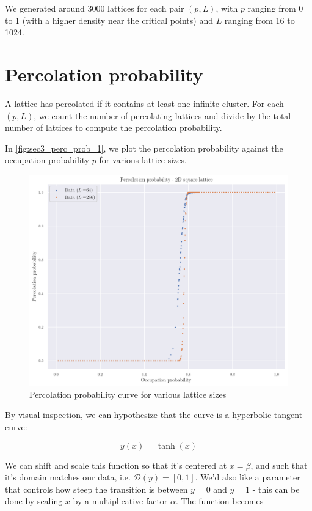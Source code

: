 We generated around 3000 lattices for each pair $(p, L)$, with $p$ ranging from 0 to 1 (with a higher density near the critical points) and $L$ ranging from 16 to 1024.


\section{Percolation probability}

A lattice has percolated if it contains at least one infinite cluster. For each $(p, L)$, we count the number of percolating lattices and divide by the total number of lattices to compute the percolation probability.

In \autoref{fig:sec3_perc_prob_1}, we plot the percolation probability against the occupation probability $p$ for various lattice sizes.


\begin{figure}[H]
  \includegraphics[width=\linewidth]{Images/sec3_perc_prob_1.png}
  \caption{Percolation probability curve for various lattice sizes}
  \label{fig:sec3_perc_prob_1}
\end{figure}

By visual inspection, we can hypothesize that the curve is a hyperbolic tangent curve: 

$$ 
y(x) = \tanh(x)
$$

We can shift and scale this function so that it's centered at $x=\beta$, and such that it's domain matches our data, i.e. $\mathcal{D}(y) = \left[ 0, 1 \right]$. We'd also like a parameter that controls how steep the transition is between $y=0$ and $y=1$ - this can be done by scaling $x$ by a multiplicative factor $\alpha$. The function becomes

